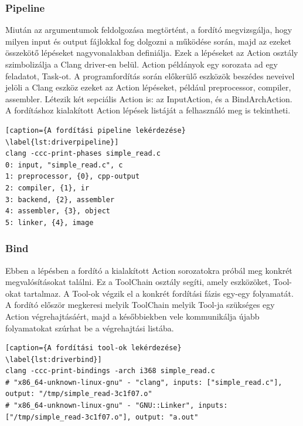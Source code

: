 \documentclass[a4paper,12pt]{report}
\begin{document}
\subsubsection{Pipeline}
Miután az argumentumok feldolgozása megtörtént, a fordító megvizsgálja, hogy milyen input és output fájlokkal fog dolgozni a működése során, majd az ezeket összekötő lépéseket nagyvonalakban definiálja. Ezek a lépéseket az Action osztály szimbolizálja a Clang driver-en belül. Action példányok egy sorozata ad egy feladatot, Task-ot. A programfordítás során előkerülő eszközök beszédes neveivel jelöli a Clang eszköz ezeket az Action lépéseket, például preprocessor, compiler, assembler. Létezik két sepciális Action is: az InputAction, és a BindArchAction. A fordításhoz kialakított Action lépések listáját a felhasználó meg is tekintheti.

\begin{minipage}{\linewidth}
\begin{lstlisting}[caption={A fordítási pipeline lekérdezése}
\label{lst:driverpipeline}]
clang -ccc-print-phases simple_read.c 
0: input, "simple_read.c", c
1: preprocessor, {0}, cpp-output
2: compiler, {1}, ir
3: backend, {2}, assembler
4: assembler, {3}, object
5: linker, {4}, image
\end{lstlisting}
\end{minipage}

\subsubsection{Bind}
Ebben a lépésben a fordító a kialakított Action sorozatokra próbál meg konkrét megvalósításokat találni. Ez a ToolChain osztály segíti, amely eszközöket, Tool-okat tartalmaz. A Tool-ok végzik el a konkrét fordítási fázis egy-egy folyamatát. A fordító először megkeresi melyik ToolChain melyik Tool-ja szükséges egy Action végrehajtásáért, majd a későbbiekben vele kommunikálja újabb folyamatokat szúrhat be a végrehajtási listába.

\begin{minipage}{\linewidth}
\begin{lstlisting}[caption={A fordítási tool-ok lekérdezése}
\label{lst:driverbind}]
clang -ccc-print-bindings -arch i368 simple_read.c
# "x86_64-unknown-linux-gnu" - "clang", inputs: ["simple_read.c"], output: "/tmp/simple_read-3c1f07.o"
# "x86_64-unknown-linux-gnu" - "GNU::Linker", inputs: ["/tmp/simple_read-3c1f07.o"], output: "a.out"
\end{lstlisting}
\end{minipage}
\end{document}
